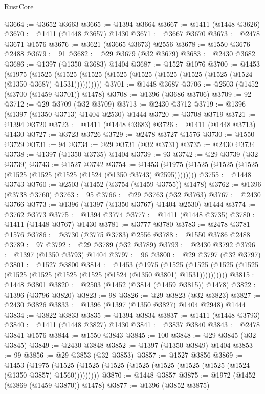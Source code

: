 \begin{lexlean}{RustCore}
\begin{coremodule}
{\begin{coremodule}
{{{{{{{{{{{{{{{{{{{{{{{{{{{{{{{{{{{{{{{{{{{{{@3664 := @3652 @3663
@3665 := @1394 @3664
@3667 := @1411 (@1448 @3626)
@3670 := @1411 (@1448 @3657) @1430
@3671 := @3667 @3670
@3673 := @2478 @3671 @1576
@3676 := @3621 (@3665 @3673) @2556
@3678 := @1550 @3676 @2488
@3679 := 91
@3682 := @29 @3679 (@32 @3679)
@3683 := @2430 @3682
@3686 := @1397 (@1350 @3683) @1404
@3687 := @1527 @1076
@3700 := @1453
    (@1975
      (@1525 (@1525 (@1525 (@1525 (@1525 (@1525 (@1525 (@1525 (@1524 (@1350 @3687) @1531))))))))))
@3701 := @1448 @3687
@3706 := @2503 (@1452 (@3700 (@1459 @3701)) @1478)
@3708 := @1396 (@3686 @3706)
@3709 := 92
@3712 := @29 @3709 (@32 @3709)
@3713 := @2430 @3712
@3719 := @1396 (@1397 (@1350 @3713) @1404 @2530) @1444
@3720 := @3708 @3719
@3721 := @1394 @3720
@3723 := @1411 (@1448 @3683)
@3726 := @1411 (@1448 @3713) @1430
@3727 := @3723 @3726
@3729 := @2478 @3727 @1576
@3730 := @1550 @3729
@3731 := 94
@3734 := @29 @3731 (@32 @3731)
@3735 := @2430 @3734
@3738 := @1397 (@1350 @3735) @1404
@3739 := 93
@3742 := @29 @3739 (@32 @3739)
@3743 := @1527 @3742
@3754 := @1453 (@1975 (@1525 (@1525 (@1525 (@1525 (@1525 (@1525 (@1524 (@1350 @3743) @2595))))))))
@3755 := @1448 @3743
@3760 := @2503 (@1452 (@3754 (@1459 @3755)) @1478)
@3762 := @1396 (@3738 @3760)
@3763 := 95
@3766 := @29 @3763 (@32 @3763)
@3767 := @2430 @3766
@3773 := @1396 (@1397 (@1350 @3767) @1404 @2530) @1444
@3774 := @3762 @3773
@3775 := @1394 @3774
@3777 := @1411 (@1448 @3735)
@3780 := @1411 (@1448 @3767) @1430
@3781 := @3777 @3780
@3783 := @2478 @3781 @1576
@3786 := @3730 (@3775 @3783) @2556
@3788 := @1550 @3786 @2488
@3789 := 97
@3792 := @29 @3789 (@32 @3789)
@3793 := @2430 @3792
@3796 := @1397 (@1350 @3793) @1404
@3797 := 96
@3800 := @29 @3797 (@32 @3797)
@3801 := @1527 @3800
@3814 := @1453
    (@1975
      (@1525 (@1525 (@1525 (@1525 (@1525 (@1525 (@1525 (@1525 (@1524 (@1350 @3801) @1531))))))))))
@3815 := @1448 @3801
@3820 := @2503 (@1452 (@3814 (@1459 @3815)) @1478)
@3822 := @1396 (@3796 @3820)
@3823 := 98
@3826 := @29 @3823 (@32 @3823)
@3827 := @2430 @3826
@3833 := @1396 (@1397 (@1350 @3827) @1404 @2948) @1444
@3834 := @3822 @3833
@3835 := @1394 @3834
@3837 := @1411 (@1448 @3793)
@3840 := @1411 (@1448 @3827) @1430
@3841 := @3837 @3840
@3843 := @2478 @3841 @1576
@3844 := @1550 @3843
@3845 := 100
@3848 := @29 @3845 (@32 @3845)
@3849 := @2430 @3848
@3852 := @1397 (@1350 @3849) @1404
@3853 := 99
@3856 := @29 @3853 (@32 @3853)
@3857 := @1527 @3856
@3869 := @1453
    (@1975 (@1525 (@1525 (@1525 (@1525 (@1525 (@1525 (@1525 (@1524 (@1350 @3857) @1560)))))))))
@3870 := @1448 @3857
@3875 := @1972 (@1452 (@3869 (@1459 @3870)) @1478)
@3877 := @1396 (@3852 @3875)
}}}}}}}}}}}}}}}}}}}}}}}}}}}}}}}}}}}}}}}}}}}}}
\end{coremodule}}
\end{coremodule}
\end{lexlean}
